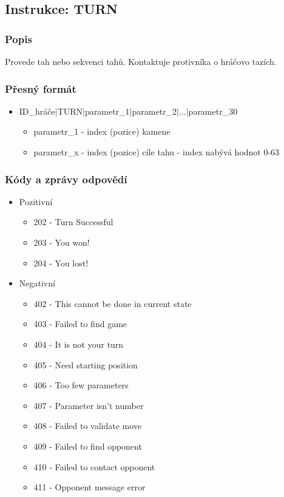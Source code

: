 \documentclass[12pt]{report}
\begin{document}
\subsection{Instrukce: TURN}
\subsubsection{Popis}
Provede tah nebo sekvenci tahů. Kontaktuje protivníka o hráčovo tazích.

\subsubsection{Přesný formát}
\begin{itemize}
	\item ID\_hráče$|$TURN$|$parametr\_1$|$parametr\_2$|$...$|$parametr\_30
		\begin{itemize}
			\item parametr\_1 - index (pozice) kamene
			\item parametr\_x - index (pozice) cíle tahu
					  - index nabývá hodnot 0-63
		\end{itemize}
\end{itemize}

\subsubsection{Kódy a zprávy odpovědí}
\begin{itemize}
	\item Pozitivní
		\begin{itemize}
			\item 202 - Turn Successful
			\item 203 - You won!
			\item 204 - You lost!
		\end{itemize}
	\item Negativní
		\begin{itemize}
			\item 402 - This cannot be done in current state
			\item 403 - Failed to find game
			\item 404 - It is not your turn
			\item 405 - Need starting position
			\item 406 - Too few parameters
			\item 407 - Parameter isn't number
			\item 408 - Failed to validate move
			\item 409 - Failed to find opponent
			\item 410 - Failed to contact opponent
			\item 411 - Opponent message error
		\end{itemize}
\end{itemize}
%
%
%
\end{document}
